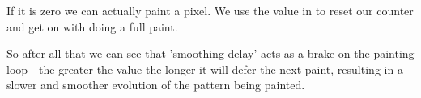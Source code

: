 If it is zero we can actually paint a pixel. We use the value in 
to reset our counter and get on with doing a full paint.

So after all that we can see that 'smoothing delay' acts as a brake on the painting loop - the greater
the value the longer it will defer the next paint, resulting in a slower and smoother evolution of the
pattern being painted.

